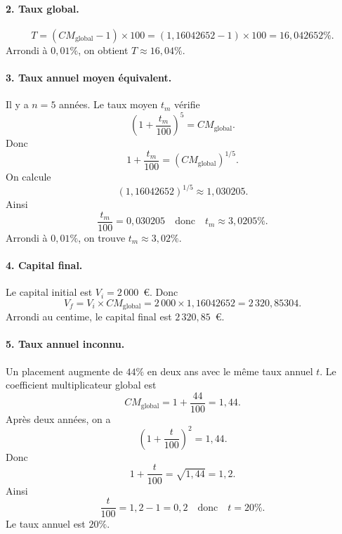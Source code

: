 \documentclass[12pt,a4paper]{article}
\begin{document}
\paragraph{2. Taux global.}
\[
T = (CM_{\text{global}} - 1) \times 100
= (1{,}16042652 - 1) \times 100
= 16{,}042652\%.
\]
Arrondi à \(0{,}01\%\), on obtient \(T \approx 16{,}04\%\).

\paragraph{3. Taux annuel moyen équivalent.}
Il y a \(n=5\) années. Le taux moyen \(t_m\) vérifie
\[
\left(1 + \frac{t_m}{100}\right)^5 = CM_{\text{global}}.
\]
Donc
\[
1 + \frac{t_m}{100} = (CM_{\text{global}})^{1/5}.
\]
On calcule
\[
(1{,}16042652)^{1/5} \approx 1{,}030205.
\]
Ainsi
\[
\frac{t_m}{100} = 0{,}030205
\quad\text{donc}\quad
t_m \approx 3{,}0205\%.
\]
Arrondi à \(0{,}01\%\), on trouve \(t_m \approx 3{,}02\%\).

\paragraph{4. Capital final.}
Le capital initial est \(V_i = 2\,000\)~\euro{}. Donc
\[
V_f = V_i \times CM_{\text{global}}
= 2\,000 \times 1{,}16042652
= 2\,320{,}85304.
\]
Arrondi au centime, le capital final est \(2\,320{,}85\)~\euro{}.

\paragraph{5. Taux annuel inconnu.}
Un placement augmente de \(44\%\) en deux ans avec le même taux annuel \(t\).  
Le coefficient multiplicateur global est
\[
CM_{\text{global}} = 1 + \frac{44}{100} = 1{,}44.
\]
Après deux années, on a
\[
\left(1 + \frac{t}{100}\right)^2 = 1{,}44.
\]
Donc
\[
1 + \frac{t}{100} = \sqrt{1{,}44} = 1{,}2.
\]
Ainsi
\[
\frac{t}{100} = 1{,}2 - 1 = 0{,}2
\quad\text{donc}\quad
t = 20\%.
\]
Le taux annuel est \(20\%\).
\end{document}
